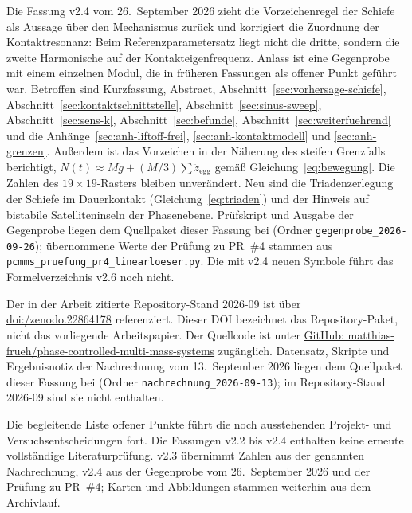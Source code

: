 \documentclass[12pt,a4paper]{report}
\begin{document}
Die Fassung v2.4 vom 26.~September 2026 zieht die Vorzeichenregel der
Schiefe als Aussage über den Mechanismus zurück und korrigiert die
Zuordnung der Kontaktresonanz: Beim Referenzparametersatz liegt nicht die
dritte, sondern die zweite Harmonische auf der Kontakteigenfrequenz.
Anlass ist eine Gegenprobe mit einem einzelnen Modul, die in früheren
Fassungen als offener Punkt geführt war. Betroffen sind Kurzfassung,
Abstract, Abschnitt~\ref{sec:vorhersage-schiefe},
Abschnitt~\ref{sec:kontaktschnittstelle}, Abschnitt~\ref{sec:sinus-sweep},
Abschnitt~\ref{sec:sens-k}, Abschnitt~\ref{sec:befunde},
Abschnitt~\ref{sec:weiterfuehrend} und die
Anhänge~\ref{sec:anh-liftoff-frei}, \ref{sec:anh-kontaktmodell} und
\ref{sec:anh-grenzen}. Außerdem ist das Vorzeichen in der Näherung des
steifen Grenzfalls berichtigt, $N(t) \approx Mg + (M/3)\sum
\ddot{z}_{\mathrm{egg}}$ gemäß Gleichung~\eqref{eq:bewegung}. Die Zahlen
des $19\times19$-Rasters bleiben unverändert. Neu sind die
Triadenzerlegung der Schiefe im Dauerkontakt
(Gleichung~\eqref{eq:triaden}) und der Hinweis auf bistabile
Satelliteninseln der Phasenebene. Prüfskript und Ausgabe der Gegenprobe
liegen dem Quellpaket dieser Fassung bei (Ordner
\texttt{gegenprobe\_2026-09-26}); übernommene Werte der Prüfung zu
PR~\#4 stammen aus \texttt{pcmms\_pruefung\_pr4\_linearloeser.py}. Die
mit v2.4 neuen Symbole führt das Formelverzeichnis v2.6 noch nicht.

Der in der Arbeit zitierte Repository-Stand 2026-09 ist über
\href{https://doi.org/10.5281/zenodo.22864178}{doi:/\allowbreak zenodo.22864178}
referenziert. Dieser DOI bezeichnet das Repository-Paket, nicht das
vorliegende Arbeitspapier. Der Quellcode ist unter
\href{https://github.com/matthias-frueh/phase-controlled-multi-mass-systems}{GitHub: matthias-frueh/\allowbreak phase-controlled-\allowbreak multi-mass-systems}
zugänglich. Datensatz, Skripte und Ergebnisnotiz der Nachrechnung vom
13.~September 2026 liegen dem Quellpaket dieser Fassung bei (Ordner
\texttt{nachrechnung\_2026-09-13}); im Repository-Stand 2026-09 sind sie
nicht enthalten.

Die begleitende Liste offener Punkte führt die noch ausstehenden
Projekt- und Versuchsentscheidungen fort. Die Fassungen v2.2 bis v2.4 enthalten keine erneute vollständige
Literaturprüfung. v2.3 übernimmt Zahlen aus der genannten Nachrechnung,
v2.4 aus der Gegenprobe vom 26.~September 2026 und der Prüfung zu
PR~\#4; Karten und Abbildungen stammen weiterhin aus dem Archivlauf.
\end{document}
